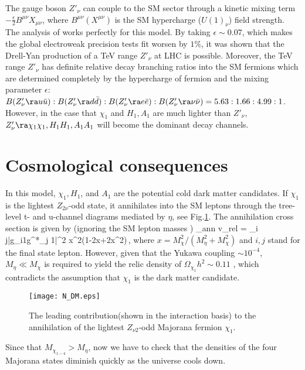 \documentclass[aps,prd,preprint,nofootinbib]{revtex4}
\begin{document}
The gauge boson $Z'_\nu$  can couple to the SM sector through a
kinetic mixing  term $-\frac{\epsilon}{2} B^{\mu\nu}X_{\mu\nu}$,
where $B^{\mu\nu}(X^{\mu\nu})$ is the SM hypercharge ($U(1)_\nu$) field strength.
The analysis of \cite{Chang:2006fp} works perfectly for this
model. By taking $\epsilon \sim 0.07$, which makes the global electroweak precision tests fit
worsen by $1\%$, it was shown that the Drell-Yan production of a TeV range $Z'_\nu$ at LHC is possible.
Moreover, the TeV range $Z'_\nu$ has  definite relative decay branching ratios into the SM fermions which are
determined completely by the hypercharge of fermion and the mixing parameter $\epsilon$\cite{Chang:2006fp}:
$B(Z'_\nu\ra u\bar{u}): B(Z'_\nu\ra d\bar{d}): B(Z'_\nu\ra e\bar{e}) : B(Z'_\nu\ra \nu\bar{\nu})
= 5.63:  1.66: 4.99:1$.
However, in the case that  $\chi_1$ and $H_1, A_1$ are much lighter than $Z'_\nu$, $Z'_\nu\ra \chi_1 \chi_1, H_1 H_1, A_1A_1$ will
become the dominant decay channels.


\section{Cosmological consequences}
In this model, $\chi_1, H_1$, and $A_1$ are the  potential cold
dark matter candidates. If $\chi_1$ is the lightest $Z_{2\nu}$-odd
state, it annihilates into the SM leptons through the tree-level t- and
u-channel diagrams mediated by $\eta$, see Fig.\ref{fig:N_DM_ann}.
The annihilation cross section is given by (ignoring the SM lepton
masses )
\beq
\sigma_{ann} v_{rel} =  \sum_{i j}|g_{i1}g^*_{j 1}|^2 x^2(1-2x+2x^2)\,,
\eeq
where $x= M_\chi^2 /(M_\eta^2 +M_\chi^2)$ and  $i,j$ stand for the
final state lepton. However, given that the  Yukawa coupling
$\sim10^{-4}$,
 $M_\eta \ll M_\chi$ is required \cite{N_DM} to yield the relic density of $\Omega_{\chi_1} h^2\sim 0.11$ \cite{DarkMatter},
which contradicts the assumption that $\chi_1$ is the dark matter candidate.
\begin{figure}[htb]
\centering
\texttt{[image: N\_DM.eps]}
\caption{ The leading contribution(shown in the interaction basis)
to the annihilation of the lightest $Z_{\nu2}$-odd Majorana
fermion $\chi_1$. \label{fig:N_DM_ann} }
\end{figure}
Since that $M_{\chi_{1-4}}> M_\eta$, now we have to check that the
densities of the four Majorana states diminish quickly as the
universe cools down.
\end{document}
